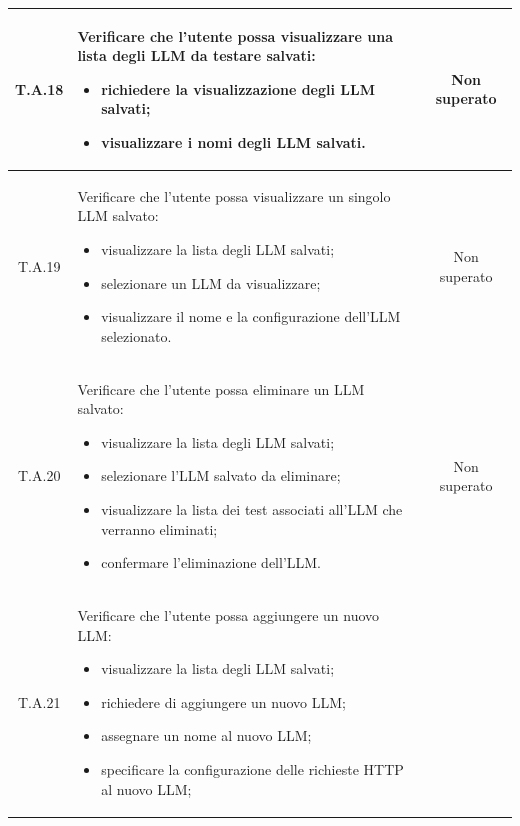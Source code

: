 \begin{tabularx}{\textwidth}{|c|X|c|}
    \hline
    \label{ta:ta18}T.A.18 & Verificare che l'utente possa visualizzare una lista degli LLM da testare salvati:
                        \begin{itemize}
                            \item richiedere la visualizzazione degli LLM salvati;
                            \item visualizzare i nomi degli LLM salvati.
                        \end{itemize} & Non superato\\ %
    \hline
    \label{ta:ta19}T.A.19 & Verificare che l'utente possa visualizzare un singolo LLM salvato:
                        \begin{itemize}
                            \item visualizzare la lista degli LLM salvati;
                            \item selezionare un LLM da visualizzare;
                            \item visualizzare il nome e la configurazione dell'LLM selezionato.
                        \end{itemize} & Non superato\\ %
    \hline
    \label{ta:ta20}T.A.20 & Verificare che l'utente possa eliminare un LLM salvato:
                        \begin{itemize}
                            \item visualizzare la lista degli LLM salvati;
                            \item selezionare l'LLM salvato da eliminare;
                            \item visualizzare la lista dei test associati all'LLM che verranno eliminati;
                            \item confermare l'eliminazione dell'LLM.
                        \end{itemize} & Non superato\\ %
    \hline
    \label{ta:ta21}T.A.21 & Verificare che l'utente possa aggiungere un nuovo LLM:
                        \begin{itemize}
                            \item visualizzare la lista degli LLM salvati;
                            \item richiedere di aggiungere un nuovo LLM;
                            \item assegnare un nome al nuovo LLM;
                            \item specificare la configurazione delle richieste HTTP al nuovo LLM;

\end{itemize}
\end{tabularx}
